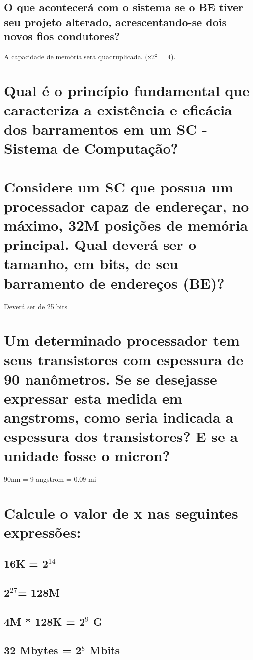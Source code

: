 \documentclass[11pt]{article}
\begin{document}
\subsection{O que acontecerá com o sistema se o BE tiver seu projeto alterado, acrescentando-se dois novos fios condutores?}
\label{sec:orgb405df6}
A capacidade de memória será quadruplicada. (x2\(^{\text{2}}\) = 4).
\section{Qual é o princípio fundamental que caracteriza a existência e eficácia dos barramentos em um SC - Sistema de Computação?}
\label{sec:orgeb9caec}

\section{Considere um SC que possua um processador capaz de endereçar, no máximo, 32M posições de memória principal. Qual deverá ser o tamanho, em bits, de seu barramento de endereços (BE)?}
\label{sec:org44421a9}
Deverá ser de 25 bits
\section{Um determinado processador tem seus transistores com espessura de 90 nanômetros. Se se desejasse expressar esta medida em angstroms, como seria indicada a espessura dos transistores? E se a unidade fosse o micron?}
\label{sec:org8238eb1}
90nm = 9 angstrom = 0.09 mi
\section{Calcule o valor de x nas seguintes expressões:}
\label{sec:org6b2c3ca}
\subsection{16K = 2\(^{\text{14}}\)}
\label{sec:org97f8fb5}
\subsection{2\(^{\text{27}}\)= 128M}
\label{sec:orgb652a0d}
\subsection{4M * 128K = 2\(^{\text{9}}\) G}
\label{sec:org136ab2f}
\subsection{32 Mbytes = 2\(^{\text{8}}\) Mbits}
\label{sec:org583287a}
\end{document}
